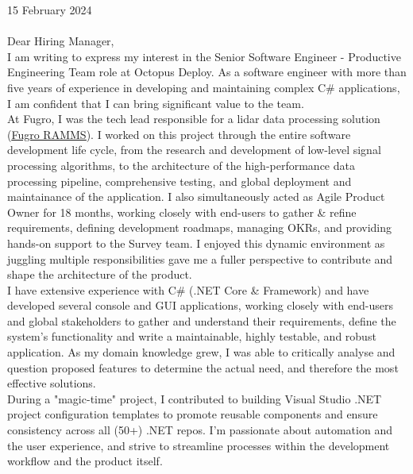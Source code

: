 \vspace{30pt}

15 February 2024 \\ \\

Dear Hiring Manager, \\

I am writing to express my interest in the Senior Software Engineer - Productive Engineering Team role at Octopus Deploy. As a software engineer with more than five years of experience in developing and maintaining complex C\# applications, I am confident that I can bring significant value to the team. \\

At Fugro, I was the tech lead responsible for a lidar data processing solution (\href{https://www.youtube.com/watch?v=f65bdm4tous}{\underline{Fugro RAMMS}}). I worked on this project through the entire software development life cycle, from the research and development of low-level signal processing algorithms, to the architecture of the high-performance data processing pipeline, comprehensive testing, and global deployment and maintainance of the application. I also simultaneously acted as Agile Product Owner for 18 months, working closely with end-users to gather \& refine requirements, defining development roadmaps, managing OKRs, and providing hands-on support to the Survey team. I enjoyed this dynamic environment as juggling multiple responsibilities gave me a fuller perspective to contribute and shape the architecture of the product. \\

I have extensive experience with C\# (.NET Core \& Framework) and have developed several console and GUI applications, working closely with end-users and global stakeholders to gather and understand their requirements, define the system's functionality and write a maintainable, highly testable, and robust application. As my domain knowledge grew, I was able to critically analyse and question proposed features to determine the actual need, and therefore the most effective solutions. \\

During a "magic-time" project, I contributed to building Visual Studio .NET project configuration templates to promote reusable components and ensure consistency across all (50+) .NET repos. I'm passionate about automation and the user experience, and strive to streamline processes within the development workflow and the product itself. \\

